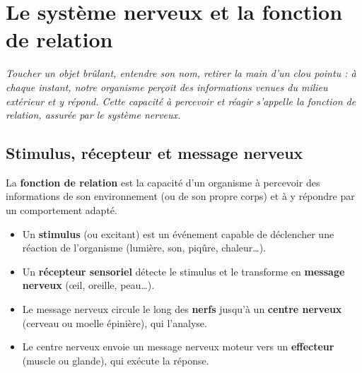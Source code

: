 \chapter{Le système nerveux et la fonction de relation}

\noindent\textit{Toucher un objet brûlant, entendre son nom, retirer la main d'un clou
pointu : à chaque instant, notre organisme perçoit des informations venues du milieu
extérieur et y répond. Cette capacité à percevoir et réagir s'appelle la fonction de
relation, assurée par le système nerveux.}
\vspace{8pt}

\connecteBanner

\section{Stimulus, récepteur et message nerveux}

\begin{definition}
La \textbf{fonction de relation} est la capacité d'un organisme à percevoir des
informations de son environnement (ou de son propre corps) et à y répondre par un
comportement adapté.
\end{definition}

\begin{propriete}
\begin{itemize}
\item Un \textbf{stimulus} (ou excitant) est un événement capable de déclencher une
réaction de l'organisme (lumière, son, piqûre, chaleur\dots).
\item Un \textbf{récepteur sensoriel} détecte le stimulus et le transforme en
\textbf{message nerveux} (œil, oreille, peau\dots).
\item Le message nerveux circule le long des \textbf{nerfs} jusqu'à un \textbf{centre
nerveux} (cerveau ou moelle épinière), qui l'analyse.
\item Le centre nerveux envoie un message nerveux moteur vers un \textbf{effecteur}
(muscle ou glande), qui exécute la réponse.
\end{itemize}
\end{propriete}

\begin{illus}
\end{illus}

